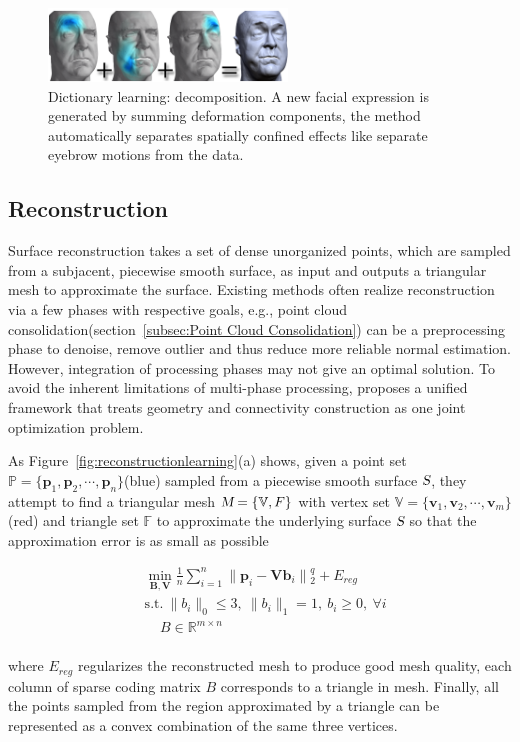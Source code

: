 \begin{figure}[ht]
  \centering
  \includegraphics[width=2.5in]{images/localdefor_learning}
  \caption{Dictionary learning: decomposition\cite{neumann2013sparse}. A new facial expression is generated by summing deformation components, the method automatically separates spatially confined effects like separate eyebrow motions from the data.}
  \label{fig:localdefor}
\end{figure}


\subsection{Reconstruction}
\label{subsec:reconstruction}

Surface reconstruction takes a set of dense unorganized points, which are sampled from a subjacent, piecewise smooth surface, as input and outputs a triangular mesh to approximate the surface.
Existing methods often realize reconstruction via a few phases with respective goals, e.g., point cloud consolidation(section~\ref{subsec:Point Cloud Consolidation}) can be a preprocessing phase to denoise, remove outlier and thus reduce more reliable normal estimation.
However, integration of processing phases may not give an optimal solution.
To avoid the inherent limitations of multi-phase processing, \cite{xiong2014robust} proposes a unified framework that treats geometry and connectivity construction as one joint optimization problem.

As Figure~\ref{fig:reconstructionlearning}(a) shows, given a point set $\mathbb{P}=\{ \mathbf{p}_1, \mathbf{p}_2, \cdots, \mathbf{p}_n \}$(blue) sampled from a piecewise smooth surface $\textsl{S}$,
they attempt to find a triangular mesh $\textsl{M}=\{ \mathbb{V}, \mathbb{}F\}$ with
vertex set $\mathbb{V}=\{ \mathbf{v}_1, \mathbf{v}_2, \cdots, \mathbf{v}_m \}$(red) and triangle set $\mathbb{F}$ to approximate the underlying surface $\textsl{S}$ so that the approximation error is as small as possible

\small{
\begin{equation}
 \label{eq:dictreconstruction}
 \begin{split}
 & \min_{\mathbf{B},\mathbf{V}}\frac{1}{n}\sum_{i=1}^{n}\|\mathbf{p}_{i}-\mathbf{Vb}_{i}\|{_2^{q}}+E_{reg}\\
 & \mathrm{s.t.}~\|b_{i}\|_0\le3,~\|b_{i}\|_1=1,~b_{i}\ge0,~\forall i \\
 & ~~~~~B\in \mathbb{R}^{m\times n}
 \end{split}
\end{equation}
}
\\
where $E_{reg}$ regularizes the reconstructed mesh to produce good mesh quality,
each column of sparse coding matrix $B$ corresponds to a triangle in mesh. Finally, all the points sampled from the region approximated by a triangle can be represented as a convex combination of the same three vertices.

